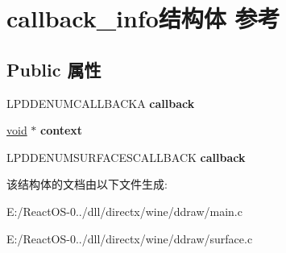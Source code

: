 \hypertarget{structcallback__info}{}\section{callback\+\_\+info结构体 参考}
\label{structcallback__info}
\subsection*{Public 属性}
\begin{DoxyCompactItemize}
\item 
\mbox{\label{structcallback__info_a83d291bdc1b5551039b9a17271d701e8}} 
L\+P\+D\+D\+E\+N\+U\+M\+C\+A\+L\+L\+B\+A\+C\+KA {\bfseries callback}
\item 
\mbox{\label{structcallback__info_aa92edb653e6f6f0e984470d9e463fccf}} 
\hyperlink{interfacevoid}{void} $\ast$ {\bfseries context}
\item 
\mbox{\label{structcallback__info_a6f2bf01266cac71bb52650ce75956e73}} 
L\+P\+D\+D\+E\+N\+U\+M\+S\+U\+R\+F\+A\+C\+E\+S\+C\+A\+L\+L\+B\+A\+CK {\bfseries callback}
\end{DoxyCompactItemize}


该结构体的文档由以下文件生成\+:\begin{DoxyCompactItemize}
\item 
E\+:/\+React\+O\+S-\/0../dll/directx/wine/ddraw/main.\+c\item 
E\+:/\+React\+O\+S-\/0../dll/directx/wine/ddraw/surface.\+c\end{DoxyCompactItemize}
